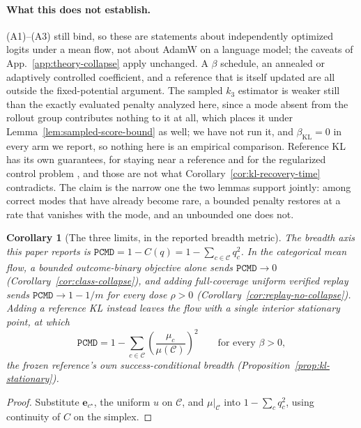 \documentclass{article}
\newcommand{\1}{\mathbf 1}
\newcommand{\pmd}{\texttt{PCMD}}
\newtheorem{corollary}[lemma]{Corollary}
\theoremstyle{remark}
\theoremstyle{definition}
\theoremstyle{plain}
\begin{document}
\paragraph{What this does not establish.} (A1)--(A3) still bind, so these are
statements about independently optimized logits under a mean flow, not about
AdamW on a language model; the caveats of
App.~\ref{app:theory-collapse} apply unchanged. A $\beta$ schedule, an
annealed or adaptively controlled coefficient, and a reference that is itself
updated are all outside the fixed-potential argument. The sampled $k_3$
estimator is weaker still than the exactly evaluated penalty analyzed here,
since a mode absent from the rollout group contributes nothing to it at all,
which places it under Lemma~\ref{lem:sampled-score-bound} as well; we have not
run it, and $\beta_{\mathrm{KL}}=0$ in every arm we report, so nothing here is
an empirical comparison. Reference KL has its own guarantees, for staying near
a reference and for the regularized control problem
\citep{geist2019regmdp,vieillard2020kl}, and those are not what
Corollary~\ref{cor:kl-recovery-time} contradicts. The claim is the narrow one
the two lemmas support jointly: among correct modes that have already become
rare, a bounded penalty restores at a rate that vanishes with the mode, and an
unbounded one does not.

\begin{corollary}[The three limits, in the reported breadth metric]
\label{cor:pmd-limits}
The breadth axis this paper reports is
$\pmd{}=1-C(q)=1-\sum_{c\in\mathcal C}q_c^2$. In the categorical mean flow, a
bounded outcome-binary objective alone sends $\pmd{}\to0$
(Corollary~\ref{cor:class-collapse}), and adding full-coverage uniform verified
replay sends $\pmd{}\to1-1/m$ for every dose $\rho>0$
(Corollary~\ref{cor:replay-no-collapse}). Adding a reference KL instead leaves
the flow with a single interior stationary point, at which
\[
 \pmd{}=1-\sum_{c\in\mathcal C}
   \left(\frac{\mu_c}{\mu(\mathcal C)}\right)^{\!2}
 \qquad\text{for every }\beta>0,
\]
the frozen reference's own success-conditional breadth
(Proposition~\ref{prop:kl-stationary}).
\end{corollary}

\begin{proof}
Substitute $\mathbf e_{c^\star}$, the uniform $u$ on $\mathcal C$, and
$\mu|_{\mathcal C}$ into $1-\sum_cq_c^2$, using continuity of $C$ on the
simplex.
\end{proof}
\end{document}
